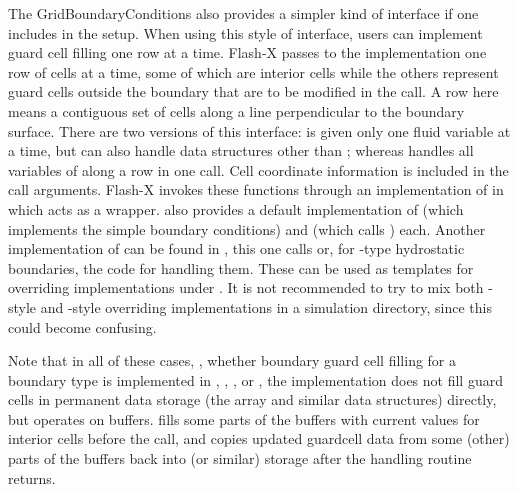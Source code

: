 The \unit{GridBoundaryConditions} \subunit also provides
a simpler kind of interface if one includes 
 in the setup.
When using this style of interface, users can implement
guard cell filling one row at a time. Flash-X passes
to the implementation one row of cells at a time,
some of which are interior cells while the others
represent guard cells outside the boundary that are
to be modified in the call.
A row here means a contiguous set of cells along a line perpendicular
to the boundary surface.
There are two versions of this interface:
 is given only one fluid
variable at a time, but can also handle data structures
other than ; whereas 
handles all variables of  along a row in one call.
Cell coordinate information is included in the call arguments.
Flash-X invokes these functions through an implementation
of  in
 which acts as a wrapper.
 also provides a default
implementation of  (which implements
the simple boundary conditions) and 
(which calls ) each.
Another implementation of 
can be found in
,
this one calls  or, for \flashx-type
hydrostatic boundaries, the code for handling them.
These can be used as templates for overriding implementations
under .
It is not recommended to try to mix both -style
and -style overriding implementations in
a simulation directory, since this could become confusing.


Note that in all of these cases, \ie, whether boundary guard
cell filling for a boundary type is implemented in
,
,
, or
\newline
{}, the implementation
does not fill guard cells in permanent data storage (the
 array and similar data structures) directly,
but operates on buffers. \flashx fills some parts of the buffers
with current values for interior cells before the
call, and copies updated guardcell data from some (other) parts
of the buffers back into  (or similar) storage
after the handling routine returns.

